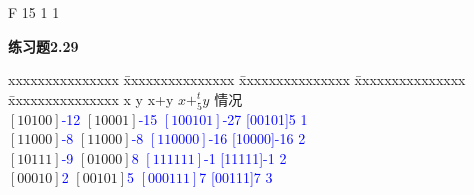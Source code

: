 \documentclass{article}
\begin{document}
\begin{CJK}{UTF8}{uyhei}
\begin{tabbing}
	\hspace{3em}F	\>	\hspace{2.5em}15\>	\hspace{3.5em}1	\>	\hspace{4em}1	\\
\end{tabbing}
\textbf{练习题2.29}
\begin{tabbing}
	xxxxxxxxxxxxxxx					\=	xxxxxxxxxxxxxxx					\=	xxxxxxxxxxxxxxx 					\=	xxxxxxxxxxxxxxx				\=	xxxxxxxxxxxxxxx				\kill
	\hspace{4em}x					\>	\hspace{4em}y					\>	\hspace{3em}x+y						\>	\hspace{2em}$x+^t_5y$			\>	\hspace{2em}情况			\\
	$[10100]$\hspace{2em}\textcolor{blue}{-12}	\>	$[10001]$\hspace{2em}\textcolor{blue}{-15}	\>	\textcolor{blue}{$[100101]$\hspace{2em}-27}		\>	\textcolor{blue}{[00101]\hspace{2em}5}	\>	\hspace{3em}\textcolor{blue}1		\\
	$[11000]$\hspace{2em}\textcolor{blue}{-8}	\>	$[11000]$\hspace{2em}\textcolor{blue}{-8}	\>	\textcolor{blue}{$[110000]$\hspace{2em}-16}		\>	\textcolor{blue}{[10000]\hspace{2em}-16}\>	\hspace{3em}\textcolor{blue}2		\\
	$[10111]$\hspace{2em}\textcolor{blue}{-9}	\>	$[01000]$\hspace{2em}\textcolor{blue}{8}	\>	\textcolor{blue}{$[111111]$\hspace{2em}-1}		\>	\textcolor{blue}{[11111]\hspace{2em}-1}	\>	\hspace{3em}\textcolor{blue}2		\\
	$[00010]$\hspace{2em}\textcolor{blue}{2}	\>	$[00101]$\hspace{2em}\textcolor{blue}{5}	\>	\textcolor{blue}{$[000111]$\hspace{2em}7}		\>	\textcolor{blue}{[00111]\hspace{2em}7}	\>	\hspace{3em}\textcolor{blue}3		\\

\end{tabbing}
\end{CJK}
\end{document}
